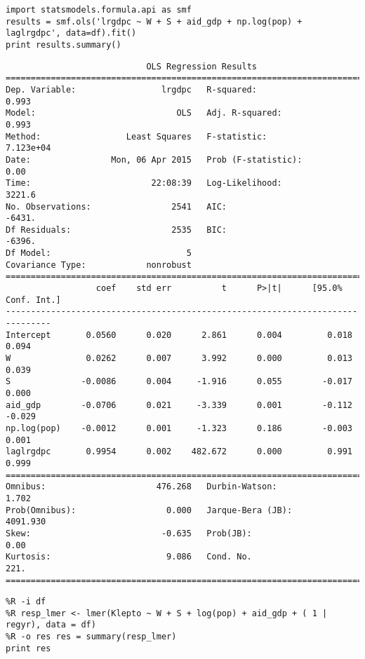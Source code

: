 \documentclass[12pt,fleqn]{article}\usepackage{common}
\begin{document}
\begin{verbatim}
import statsmodels.formula.api as smf
results = smf.ols('lrgdpc ~ W + S + aid_gdp + np.log(pop) + laglrgdpc', data=df).fit()
print results.summary()
\end{verbatim}

\begin{verbatim}
                            OLS Regression Results                            
==============================================================================
Dep. Variable:                 lrgdpc   R-squared:                       0.993
Model:                            OLS   Adj. R-squared:                  0.993
Method:                 Least Squares   F-statistic:                 7.123e+04
Date:                Mon, 06 Apr 2015   Prob (F-statistic):               0.00
Time:                        22:08:39   Log-Likelihood:                 3221.6
No. Observations:                2541   AIC:                            -6431.
Df Residuals:                    2535   BIC:                            -6396.
Df Model:                           5                                         
Covariance Type:            nonrobust                                         
===============================================================================
                  coef    std err          t      P>|t|      [95.0% Conf. Int.]
-------------------------------------------------------------------------------
Intercept       0.0560      0.020      2.861      0.004         0.018     0.094
W               0.0262      0.007      3.992      0.000         0.013     0.039
S              -0.0086      0.004     -1.916      0.055        -0.017     0.000
aid_gdp        -0.0706      0.021     -3.339      0.001        -0.112    -0.029
np.log(pop)    -0.0012      0.001     -1.323      0.186        -0.003     0.001
laglrgdpc       0.9954      0.002    482.672      0.000         0.991     0.999
==============================================================================
Omnibus:                      476.268   Durbin-Watson:                   1.702
Prob(Omnibus):                  0.000   Jarque-Bera (JB):             4091.930
Skew:                          -0.635   Prob(JB):                         0.00
Kurtosis:                       9.086   Cond. No.                         221.
==============================================================================

\end{verbatim}


\begin{verbatim}
%R -i df
%R resp_lmer <- lmer(Klepto ~ W + S + log(pop) + aid_gdp + ( 1 | regyr), data = df)
%R -o res res = summary(resp_lmer)
print res
\end{verbatim}
\end{document}
